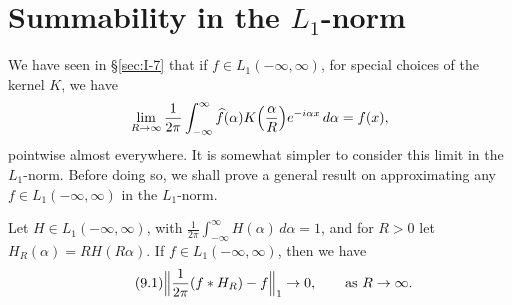 \section{Summability in the \texorpdfstring{$L_1$}{L1}-norm}
\label{sec:I-9}

We have seen in \S\ref{sec:I-7} that if $f\in L_1(-\infty,\infty)$, for special choices of the kernel $K$, we have
\begin{equation*}
\lim_{R\to\infty}\frac{1}{2\pi}\int_{-\infty}^{\infty}\widehat f(\alpha)K\Bigl(\frac{\alpha}{R}\Bigr)e^{-i\alpha x}\,d\alpha=f(x),
\end{equation*}
pointwise almost everywhere. It is somewhat simpler to consider this limit in the $L_1$-norm. Before doing so, we shall prove a general result on approximating any $f\in L_1(-\infty,\infty)$ in the $L_1$-norm.

\begin{theorem}\label{thm:I-15}
Let $H\in L_1(-\infty,\infty)$, with $\frac{1}{2\pi}\int_{-\infty}^{\infty}H(\alpha)\,d\alpha=1$, and for $R>0$ let $H_R(\alpha)=RH(R\alpha)$. If $f\in L_1(-\infty,\infty)$, then we have
\begin{equation}\label{eq:I-9.1}\tag{9.1}
\Bigl\|\frac{1}{2\pi}(f*H_R)-f\Bigr\|_1\to 0,\qquad\text{as }R\to\infty.
\end{equation}
\end{theorem}

